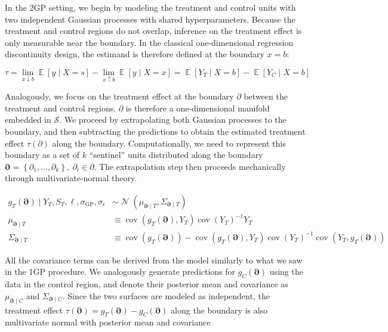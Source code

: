 \documentclass[letter]{article}
\newcommand{\genericdel}[3]{%
      \left#1#3\right#2
    }
\newcommand{\del}[1]{\genericdel(){#1}}
\newcommand{\sbr}[1]{\genericdel[]{#1}}
\newcommand{\cbr}[1]{\genericdel\{\}{#1}}
\DeclareMathOperator{\E}{\mathbb{E}}
\DeclareMathOperator{\cov}{{cov}}
\DeclareMathOperator{\normal}{\mathcal{N}}
\newcommand{\scrS}{\mathscr{S}}
\newcommand{\sigmaf}{\sigma_{\mathrm{GP}}}
\newcommand{\sigman}{\sigma_{\epsilon}}
\newcommand{\boundary}{\partial}
\newcommand{\sentinels}{\bm{\boundary}}
\begin{document}
In the 2GP setting, we begin by modeling the treatment and control units
with two independent Gaussian processes with shared hyperparameters.
Because the treatment and control regions do not overlap, inference on
the treatment effect is only measurable near the boundary. In the
classical one-dimensional regression discontinuity design, the estimand
is therefore defined at the boundary \(x=b\):

\begin{equation}
\tau = \lim_{x \downarrow b} \E\sbr{y \mid X=s} - \lim_{x \uparrow b} \E\sbr{y \mid X=x} = \E\sbr{Y_T \mid X=b} - \E\sbr{Y_C \mid X=b}
\end{equation}

Analogously, we focus on the treatment effect at the boundary
\(\boundary\) between the treatment and control regions. \(\boundary\)
is therefore a one-dimensional manifold embedded in \(\scrS\). We
proceed by extrapolating both Gaussian processes to the boundary, and
then subtracting the predictions to obtain the estimated treatment
effect \(\tau(\boundary)\) along the boundary. Computationally, we need
to represent this boundary as a set of \(k\) ``sentinel'' units
distributed along the boundary
\(\sentinels=\cbr{\boundary_1,\ldots,\boundary_k},~\partial_i \in \partial\).
The extrapolation step then proceeds mechanically through
multivariate-normal theory.

\begin{equation}\begin{split}
    g_T(\sentinels) \mid Y_T, S_T, \ell, \sigmaf, \sigman &\sim \normal\del{\mu_{\sentinels \mid T}, \Sigma_{\sentinels \mid T}} \\
    \mu_{\sentinels \mid T} &\equiv \cov\del{g_T(\sentinels), Y_T} \cov\del{Y_T}^{-1}  Y_T \\
    \Sigma_{\sentinels \mid T} &\equiv \cov \del{g_T(\sentinels)} - \cov\del{g_T(\sentinels), Y_T} \cov\del{Y_T}^{-1} \cov\del{Y_T,g_T(\sentinels) \label{eq:postvarT2gp}
    }
\end{split}\end{equation}

All the covariance terms can be derived from the model similarly to what
we saw in the 1GP procedure. We analogously generate predictions for
\(g_C(\sentinels)\) using the data in the control region, and denote
their posterior mean and covariance as \(\mu_{\sentinels \mid C}\) and
\(\Sigma_{\sentinels \mid C}\). Since the two surfaces are modeled as
independent, the treatment effect
\(\tau(\sentinels)=g_T(\sentinels)-g_C(\sentinels)\) along the boundary
is also multivariate normal with posterior mean and covariance
\end{document}
